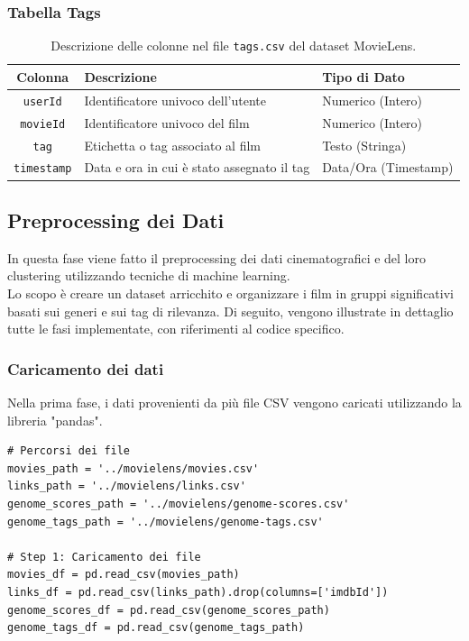\documentclass[a4paper,12pt]{article}
\begin{document}
        \subsubsection{Tabella Tags}
			\begin{table}[h!]
				\centering
					\begin{tabular}{|c|l|l|}
						\hline
						\textbf{Colonna} & \textbf{Descrizione} & \textbf{Tipo di Dato} \\ \hline
						\texttt{userId} & Identificatore univoco dell'utente & Numerico (Intero) \\ \hline
						\texttt{movieId} & Identificatore univoco del film & Numerico (Intero) \\ \hline
						\texttt{tag} & Etichetta o tag associato al film & Testo (Stringa) \\ \hline
						\texttt{timestamp} & Data e ora in cui è stato assegnato il tag & Data/Ora (Timestamp) \\ \hline
					\end{tabular}
				\caption{Descrizione delle colonne nel file \texttt{tags.csv} del dataset MovieLens.}
			\end{table}


    \subsection{Preprocessing dei Dati}
	In questa fase viene fatto il preprocessing dei dati cinematografici e del loro clustering utilizzando tecniche di machine learning.\\Lo scopo è creare un dataset arricchito e organizzare i film in gruppi significativi basati sui generi e sui tag di rilevanza. Di seguito, vengono illustrate in dettaglio tutte le fasi implementate, con riferimenti al codice specifico.
        \subsubsection{Caricamento dei dati}
	Nella prima fase, i dati provenienti da più file CSV vengono caricati utilizzando la libreria "pandas". 
\begin{verbatim}
# Percorsi dei file
movies_path = '../movielens/movies.csv'
links_path = '../movielens/links.csv'
genome_scores_path = '../movielens/genome-scores.csv'
genome_tags_path = '../movielens/genome-tags.csv'

# Step 1: Caricamento dei file
movies_df = pd.read_csv(movies_path)
links_df = pd.read_csv(links_path).drop(columns=['imdbId'])
genome_scores_df = pd.read_csv(genome_scores_path)
genome_tags_df = pd.read_csv(genome_tags_path)
\end{verbatim}
\end{document}
